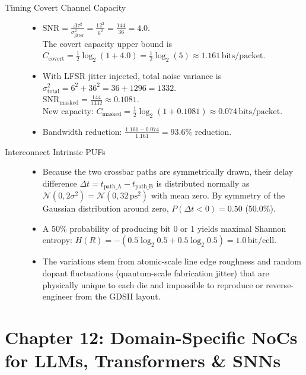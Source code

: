 \begin{description}
    \item[Timing Covert Channel Capacity]
    \begin{itemize}
        \item $\mathrm{SNR} = \frac{\Delta \tau^2}{\sigma_{\mathrm{jitter}}^2} = \frac{12^2}{6^2} = \frac{144}{36} = \mathbf{4.0}$. \\
        The covert capacity upper bound is $C_{\mathrm{covert}} = \frac{1}{2} \log_2(1 + 4.0) = \frac{1}{2} \log_2(5) \approx \mathbf{1.161\,\mathrm{bits/packet}}$.
        \item With LFSR jitter injected, total noise variance is $\sigma_{\mathrm{total}}^2 = 6^2 + 36^2 = 36 + 1296 = 1332$. \\
        $\mathrm{SNR}_{\mathrm{masked}} = \frac{144}{1332} \approx 0.1081$. \\
        New capacity: $C_{\mathrm{masked}} = \frac{1}{2} \log_2(1 + 0.1081) \approx \mathbf{0.074\,\mathrm{bits/packet}}$.
        \item Bandwidth reduction: $\frac{1.161 - 0.074}{1.161} = \mathbf{93.6\%}$ reduction.
    \end{itemize}

    \item[Interconnect Intrinsic PUFs]
    \begin{itemize}
        \item Because the two crossbar paths are symmetrically drawn, their delay difference $\Delta t = t_{\mathrm{path\_A}} - t_{\mathrm{path\_B}}$ is distributed normally as $\mathcal{N}(0, 2\sigma^2) = \mathcal{N}(0, 32\,\mathrm{ps}^2)$ with mean zero. By symmetry of the Gaussian distribution around zero, $P(\Delta t < 0) = \mathbf{0.50}$ (50.0\%).
        \item A 50\% probability of producing bit 0 or 1 yields maximal Shannon entropy: $H(R) = - (0.5 \log_2 0.5 + 0.5 \log_2 0.5) = \mathbf{1.0\,\mathrm{bit/cell}}$.
        \item The variations stem from atomic-scale line edge roughness and random dopant fluctuations (quantum-scale fabrication jitter) that are physically unique to each die and impossible to reproduce or reverse-engineer from the GDSII layout.
    \end{itemize}
\end{description}

\section*{Chapter 12: Domain-Specific NoCs for LLMs, Transformers \& SNNs}

